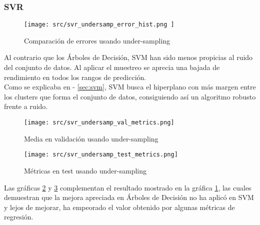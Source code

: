 \subsubsection*{SVR}
\begin{figure}[H]
	\centering
	\texttt{[image: src/svr\_undersamp\_error\_hist.png ]}
	\caption{Comparación de errores usando under-sampling}
	\label{fig:cmp_error_svr}
\end{figure}
Al contrario que los Árboles de Decisión, SVM han sido menos propicias al ruido del conjunto de datos. Al aplicar el muestreo se aprecia una bajada de rendimiento en todos los rangos de predicción. \\
Como se explicaba en  - \ref{sec:svm}, SVM busca el hiperplano con más margen entre los clusters que forma el conjunto de datos, consiguiendo así un algoritmo robusto frente a ruido.
\begin{figure}[H]
	\centering
	\texttt{[image: src/svr\_undersamp\_val\_metrics.png]}
	\caption{Media en validación usando under-sampling}
	\label{fig:cmp_val_svr}
\end{figure}
\begin{figure}[H]
	\centering
	\texttt{[image: src/svr\_undersamp\_test\_metrics.png]}
	\caption{Métricas en test usando under-sampling}
	\label{fig:cmp_test_svr}
\end{figure}
Las gráficas \ref{fig:cmp_val_svr} y \ref{fig:cmp_test_svr} complementan el resultado mostrado en la gráfica \ref{fig:cmp_error_svr}, las cuales demuestran que la mejora apreciada en Árboles de Decisión no ha aplicó en SVM y lejos de mejorar, ha empeorado el valor obtenido por algunas métricas de regresión.\\

